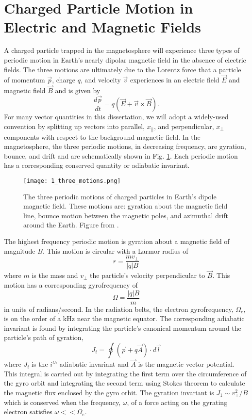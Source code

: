 \section{Charged Particle Motion in Electric and Magnetic Fields}\label{Intro:particle_motion}
A charged particle trapped in the magnetosphere will experience three types of periodic motion in Earth's nearly dipolar magnetic field in the absence of electric fields. The three motions are ultimately due to the Lorentz force that a particle of momentum $\vec{p}$, charge $q$, and velocity $\vec{v}$ experiences in an electric field $\vec{E}$ and magnetic field $\vec{B}$ and is given by
\begin{equation} \label{Intro:Lorentz}
\frac{d\vec{p}}{dt} = q(\vec{E} + \vec{v} \times \vec{B}).
\end{equation} For many vector quantities in this dissertation, we will adopt a widely-used convention by splitting up vectors into parallel, $x_{||}$, and perpendicular, $x_\perp$ components with respect to the background magnetic field. In the magnetosphere, the three periodic motions, in decreasing frequency, are gyration, bounce, and drift and are schematically shown in Fig. \ref{Intro:motion_diagram}. Each periodic motion has a corresponding conserved quantity or adiabatic invariant. 

\begin{figure}
\texttt{[image: 1\_three\_motions.png]}
\caption{The three periodic motions of charged particles in Earth's dipole magnetic field. These motions are: gyration about the magnetic field line, bounce motion between the magnetic poles, and azimuthal drift around the Earth. Figure from \citep{Baumjohann1997}.}
\label{Intro:motion_diagram}
\end{figure}


The highest frequency periodic motion is gyration about a magnetic field of magnitude $B$. This motion is circular with a Larmor radius of 
\begin{equation}
r = \frac{m v_\perp}{|q| B}
\end{equation} where $m$ is the mass and $v_\perp$ the particle's velocity perpendicular to $\vec{B}$. This motion has a corresponding gyrofrequency of
\begin{equation}
\Omega = \frac{|q| B}{m}
\end{equation} in units of radians/second. In the radiation belts, the electron gyrofrequency, $\Omega_e$, is on the order of a kHz near the magnetic equator. The corresponding adiabatic invariant is found by integrating the particle's canonical momentum around the particle's path of gyration,
\begin{equation} \label{J}
J_i = \oint (\vec{p} + q \vec{A}) \cdot d\vec{l}
\end{equation} where $J_i$ is the $i^{th}$ adiabatic invariant and $\vec{A}$ is the magnetic vector potential. This integral is carried out by integrating the first term over the circumference of the gyro orbit and integrating the second term using Stokes theorem to calculate the magnetic flux enclosed by the gyro orbit.  The gyration invariant is $J_1 \sim v_\perp^2 / B$ which is conserved when the frequency, $\omega$, of a force acting on the gyrating electron satisfies $\omega << \Omega_e$.

